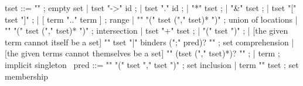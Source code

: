 \begin{syntax}
  tset ::= { "\empty" } ; empty set
       | tset "->" id ;
       | tset "." id ;
       | "*" tset ;
       | "&" tset ;
       | tset "[" tset "]" ;
       | [ term ".." term ] ; range
       | { "\union" "(" tset ("," tset)* ")" } ; union of locations
       | { "\inter" "(" tset ("," tset)* ")" }; intersection
       | tset "+" tset ;
       | "(" tset ")" ;
       | {[the given term cannot itself be a set]
           "{" tset "|" binders (";" pred)? "}"} ; set comprehension
       | {[the given terms cannot themselves be a set] 
          "{" (tset ("," tset)*)? "}" };
       | term ; implicit singleton
       \
  pred ::= { "\subset" "(" tset "," tset ")" } ; set inclusion
       | { term "\in" tset } ; set membership
\end{syntax}

